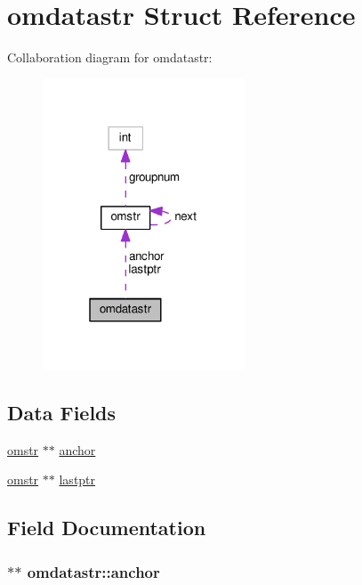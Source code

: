 \hypertarget{structomdatastr}{}\section{omdatastr Struct Reference}
\label{structomdatastr}


Collaboration diagram for omdatastr\+:
\nopagebreak
\begin{figure}[H]
\begin{center}
\leavevmode
\includegraphics[width=171pt]{structomdatastr__coll__graph}
\end{center}
\end{figure}
\subsection*{Data Fields}
\begin{DoxyCompactItemize}
\item 
\hyperlink{structomstr}{omstr} $\ast$$\ast$ \hyperlink{structomdatastr_a3fe2a5919f9287893f27ec4eed2cd070}{anchor}
\item 
\hyperlink{structomstr}{omstr} $\ast$$\ast$ \hyperlink{structomdatastr_a76352b9ff79e8bd0ac6faa9199b8fd53}{lastptr}
\end{DoxyCompactItemize}


\subsection{Field Documentation}
\subsubsection[{\texorpdfstring{anchor}{anchor}}]{$\ast$$\ast$ omdatastr\+::anchor}\hypertarget{structomdatastr_a3fe2a5919f9287893f27ec4eed2cd070}{}\label{structomdatastr_a3fe2a5919f9287893f27ec4eed2cd070}
